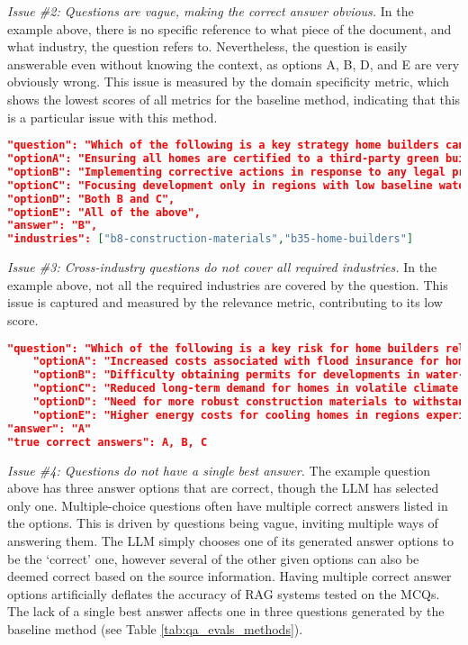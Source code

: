 \textit{Issue \#2: Questions are vague, making the correct answer obvious.} In the example above, there is no specific reference to what piece of the document, and what industry, the question refers to. Nevertheless, the question is easily answerable even without knowing the context, as options A, B, D, and E are very obviously wrong. This issue is measured by the domain specificity metric, which shows the lowest scores of all metrics for the baseline method, indicating that this is a particular issue with this method.


\begin{lstlisting}[language=JSON,firstnumber=1,label={lst:memprompt},caption={Question Example 3: Cross-industry single-hop MCQ}]
"question": "Which of the following is a key strategy home builders can use to mitigate environmental legal risks?",
"optionA": "Ensuring all homes are certified to a third-party green building standard",
"optionB": "Implementing corrective actions in response to any legal proceedings related to environmental regulations",
"optionC": "Focusing development only in regions with low baseline water stress",
"optionD": "Both B and C",
"optionE": "All of the above",
"answer": "B",
"industries": ["b8-construction-materials","b35-home-builders"]
\end{lstlisting}

\textit{Issue \#3: Cross-industry questions do not cover all required industries.} In the example above, not all the required industries are covered by the question. This issue is captured and measured by the relevance metric, contributing to its low score.

\begin{lstlisting}[language=JSON,firstnumber=1,label={lst:memprompt},caption={Question Example 4: Cross-industry single-hop MCQ}]
"question": "Which of the following is a key risk for home builders related to climate change adaptation?",
    "optionA": "Increased costs associated with flood insurance for homes in 100-year flood zones",
    "optionB": "Difficulty obtaining permits for developments in water-stressed regions",
    "optionC": "Reduced long-term demand for homes in volatile climate regions",
    "optionD": "Need for more robust construction materials to withstand extreme weather events",
    "optionE": "Higher energy costs for cooling homes in regions experiencing rising temperatures",
"answer": "A"
"true correct answers": A, B, C
\end{lstlisting}


\textit{Issue \#4: Questions do not have a single best answer.} The example question above has three answer options that are correct, though the LLM has selected only one. Multiple-choice questions often have multiple correct answers listed in the options. This is driven by questions being vague, inviting multiple ways of answering them. The LLM simply chooses one of its generated answer options to be the `correct' one, however several of the other given options can also be deemed correct based on the source information. Having multiple correct answer options artificially deflates the accuracy of RAG systems tested on the MCQs. The lack of a single best answer affects one in three questions generated by the baseline method (see Table \ref{tab:qa_evals_methods}).


